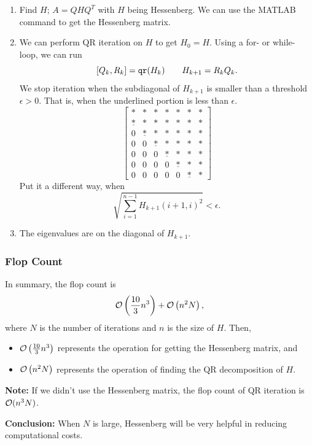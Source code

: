\documentclass[letterpaper]{article}
\newcommand{\0}{\mathbf{0}}
\begin{document}
\begin{enumerate}
    \item Find $H$; $A = QHQ^T$ with $H$ being Hessenberg. We can use the MATLAB command  to get the Hessenberg matrix. 
    \item We can perform QR iteration on $H$ to get $H_0 = H$. Using a for- or while- loop, we can run \[[Q_k, R_k] = \texttt{qr}(H_k) \qquad H_{k + 1} = R_k Q_k.\]
    We stop iteration when the subdiagonal of $H_{k + 1}$ is smaller than a threshold $\epsilon > 0$. That is, when the underlined portion is less than $\epsilon$. 
    \[\begin{bmatrix}
        * & * & * & * & * & * & * \\ 
        \underline{*} & * & * & * & * & * & * \\
        0 & \underline{*} & * & * & * & * & * \\
        0 & 0 & \underline{*} & * & * & * & * \\ 
        0 & 0 & 0 & \underline{*} & * & * & * \\ 
        0 & 0 & 0 & 0 & \underline{*} & * & * \\ 
        0 & 0 & 0 & 0 & 0 & \underline{*} & *
    \end{bmatrix}\]
    Put it a different way, when 
    \[\sqrt{\sum_{i = 1}^{n - 1} H_{k + 1} (i + 1, i)^2} < \epsilon.\]

    \item The eigenvalues are on the diagonal of $H_{k + 1}$. 
\end{enumerate}


\subsubsection{Flop Count}
In summary, the flop count is \[\mathcal{O}\left(\frac{10}{3}n^3\right) + \mathcal{O}\left(n^2 N\right),\]
where $N$ is the number of iterations and $n$ is the size of $H$. Then, 
\begin{itemize}
    \item $\mathcal{O}\left(\frac{10}{3}n^3\right)$ represents the operation for getting the Hessenberg matrix, and 
    \item $\mathcal{O}\left(n^2 N\right)$ represents the operation of finding the QR decomposition of $H$.
\end{itemize}
\textbf{Note:} If we didn't use the Hessenberg matrix, the flop count of QR iteration is $\mathcal{O}(n^3 N)$. 

\textbf{Conclusion:} When $N$ is large, Hessenberg will be very helpful in reducing computational costs.
\end{document}
